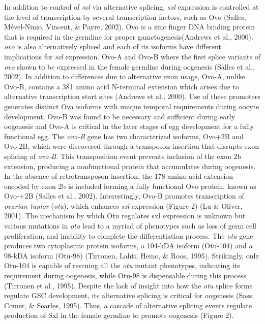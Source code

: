 \documentclass[12pt,oneside]{reedthesis}
\begin{document}
In addition to control of \emph{sxl} via alternative splicing, \emph{sxl}
expression is controlled at the level of transcription by several
transcription factors, such as Ovo (Salles, Mével-Ninio, Vincent, \& Payre, 2002). Ovo is a zinc
finger DNA binding protein that is required in the germline for proper
gametogenesis(Andrews et al., 2000). \emph{ovo} is also alternatively spliced and
each of its isoforms have different implications for \emph{sxl} expression.
Ovo-A and Ovo-B where the first splice variants of \emph{ovo} shown to be
expressed in the female germline during oogenesis (Salles et al., 2002). In
addition to differences due to alternative exon usage, Ovo-A, unlike
Ovo-B, contains a 381 amino acid N-terminal extension which arises due
to alternative transcription start sites (Andrews et al., 2000). Use of
these promoters generates distinct Ova isoforms with unique temporal
requirements during oocyte development; Ovo-B was found to be necessary
and sufficient during early oogenesis and Ovo-A is critical in the later
stages of egg development for a fully functional egg. The \emph{ovo-B} gene
has two characterized isoforms, Ovo+2B and Ovo-2B, which were discovered
through a transposon insertion that disrupts exon splicing of \emph{ovo-B}.
This transposition event prevents inclusion of the exon 2b extension,
producing a nonfunctional protein that accumulates during oogenesis. In
the absence of retrotransposon insertion, the 178-amino acid extension
encoded by exon 2b is included forming a fully functional Ovo protein,
known as Ovo-+2B (Salles et al., 2002). Interestingly, Ovo-B promotes
transcription of \emph{ovarian tumor} (\emph{otu}), which enhances \emph{sxl}
expression (Figure 2) (Lu \& Oliver, 2001). The mechanism by which Otu regulates
sxl expression is unknown but various mutations in \emph{otu} lead to a
myriad of phenotypes such as loss of germ cell proliferation, and
inability to complete the differentiation process. The \emph{otu} gene
produces two cytoplasmic protein isoforms, a 104-kDA isoform (Otu-104)
and a 98-kDA isoform (Otu-98) (Tirronen, Lahti, Heino, \& Roos, 1995). Strikingly, only
Otu-104 is capable of rescuing all the \emph{otu} mutant phenotypes,
indicating its requirement during oogenesis, while Otu-98 is dispensable
during this process (Tirronen et al., 1995). Despite the lack of insight into
how the \emph{otu} splice forms regulate GSC development, its alternative
splicing is critical for oogenesis (Sass, Comer, \& Searles, 1995). Thus, a cascade of
alternative splicing events regulate production of Sxl in the female
germline to promote oogenesis (Figure 2).
\end{document}
